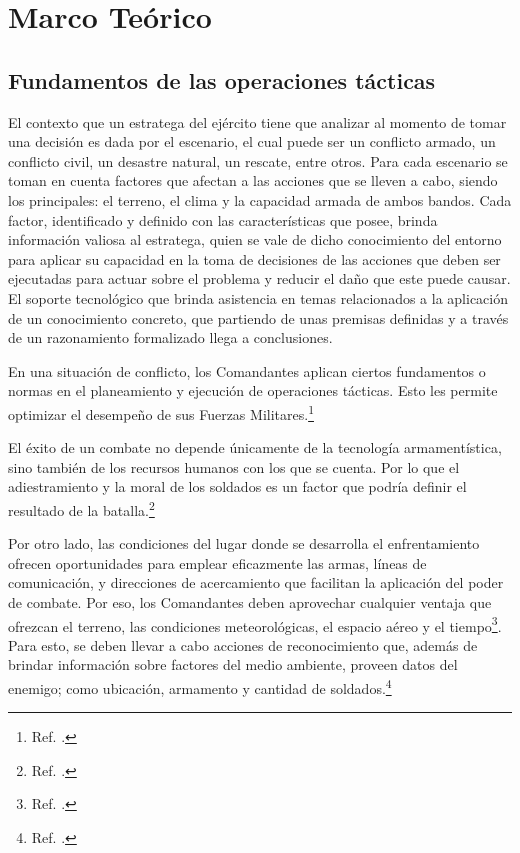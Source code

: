 \chapter{Marco Teórico}



\section{Fundamentos de las operaciones tácticas}

El contexto que un estratega del ejército tiene que analizar al momento de tomar una decisión es dada por el escenario, el cual puede ser un conflicto armado, un conflicto civil, un desastre natural, un rescate, entre otros. Para cada escenario se toman en cuenta factores que afectan a las acciones que se lleven a cabo, siendo los principales: el terreno, el clima y la capacidad armada de ambos bandos. Cada factor, identificado y definido con las características que posee, brinda información valiosa al estratega, quien se vale de dicho conocimiento del entorno para aplicar su capacidad en la toma de decisiones de las acciones que deben ser ejecutadas para actuar sobre el problema y reducir el daño que este puede causar.
El soporte tecnológico que brinda asistencia en temas relacionados a la aplicación de un conocimiento concreto, que partiendo de unas premisas definidas y a través de un razonamiento formalizado llega a conclusiones.

En una situación de conflicto, los Comandantes aplican ciertos fundamentos o normas en el planeamiento y ejecución de operaciones tácticas. Esto les permite optimizar el desempeño de sus Fuerzas Militares.\footnote{Ref. \citealt{Asesores12}.}

El éxito de un combate no depende únicamente de la tecnología armamentística, sino también de los recursos humanos con los que se cuenta. Por lo que el adiestramiento y la moral de los soldados es un factor que podría definir el resultado de la batalla.\footnote{Ref. \citealt{Asesores12}.}

Por otro lado, las condiciones del lugar donde se desarrolla el enfrentamiento ofrecen oportunidades para emplear eficazmente las armas, líneas de comunicación, y direcciones de acercamiento que facilitan la aplicación del poder de combate. Por eso, los Comandantes deben aprovechar cualquier ventaja que ofrezcan el terreno, las condiciones meteorológicas, el espacio aéreo y el tiempo\footnote{Ref. \citealt{Asesores12}.}. Para esto, se deben llevar a cabo acciones de reconocimiento que, además de brindar información sobre factores del medio ambiente, proveen datos del enemigo; como ubicación, armamento y cantidad de soldados.\footnote{Ref. \citealt{Asesores12}.}


